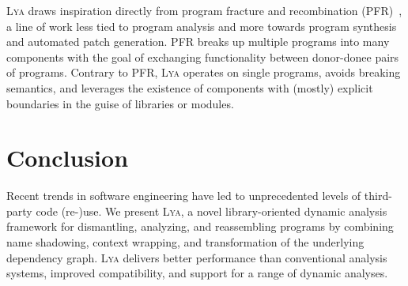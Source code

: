 \documentclass[letterpaper,twocolumn,10pt]{article}
\newcommand{\sys}{{\scshape Lya}\xspace}
\begin{document}

\sys draws inspiration directly from program fracture and recombination (PFR)~\cite{fracture1, fracture3}, a line of work less tied to program analysis and more towards program synthesis and automated patch generation.
PFR breaks up multiple programs into many components with the goal of exchanging functionality between donor-donee pairs of programs.
Contrary to PFR, \sys operates on single programs, avoids breaking semantics, and leverages the existence of components with (mostly) explicit boundaries in the guise of libraries or modules.

\section{Conclusion}
\label{end}

Recent trends in software engineering have led to unprecedented levels of third-party code (re-)use.
We present \sys, a novel library-oriented dynamic analysis framework for dismantling, analyzing, and reassembling programs by combining name shadowing, context wrapping, and transformation of the underlying dependency graph.
\sys delivers better performance  than conventional analysis systems, improved compatibility, and support for a range of dynamic analyses.




\end{document}
